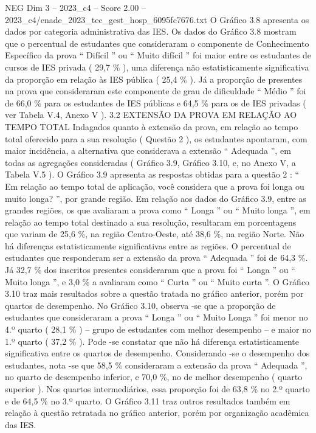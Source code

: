 \begin{textsample}{NEG Dim 3 – 2023\_c4 – Score 2.00 – 2023\_c4/enade\_2023\_tec\_gest\_hosp\_6095fc7676.txt}
O Gráfico 3.8 apresenta os dados por categoria administrativa das IES.
Os dados do Gráfico 3.8 mostram que o percentual de estudantes que consideraram o componente de Conhecimento Específico da prova “ Difícil ” ou “ Muito difícil ” foi maior entre os estudantes de cursos de IES privada ( 29,7 \% ), uma diferença não estatisticamente significativa da proporção em relação às IES pública ( 25,4 \% ).
Já a proporção de presentes na prova que consideraram este componente de grau de dificuldade “ Médio ” foi de 66,0 \% para os estudantes de IES públicas e 64,5 \% para os de IES privadas ( ver Tabela V.4, Anexo V ). 3.2 EXTENSÃO DA PROVA EM RELAÇÃO AO TEMPO TOTAL Indagados quanto à extensão da prova, em relação ao tempo total oferecido para a sua resolução ( Questão 2 ), os estudantes apontaram, com maior incidência, a alternativa que considerava a extensão “ Adequada ”, em todas as agregações consideradas ( Gráfico 3.9, Gráfico 3.10, e, no Anexo V, a Tabela V.5 ).
O Gráfico 3.9 apresenta as respostas obtidas para a questão 2 : “ Em relação ao tempo total de aplicação, você considera que a prova foi longa ou muito longa? ”, por grande região.
Em relação aos dados do Gráfico 3.9, entre as grandes regiões, os que avaliaram a prova como “ Longa ” ou “ Muito longa ”, em relação ao tempo total destinado a sua resolução, resultaram em porcentagens que variam de 25,6 \%, na região Centro-Oeste, até 38,6 \%, na região Norte.
Não há diferenças estatisticamente significativas entre as regiões.
O percentual de estudantes que responderam ser a extensão da prova “ Adequada ” foi de 64,3 \%.
Já 32,7 \% dos inscritos presentes consideraram que a prova foi “ Longa ” ou “ Muito longa ”, e 3,0 \% a avaliaram como “ Curta ” ou “ Muito curta ”.
O Gráfico 3.10 traz mais resultados sobre a questão tratada no gráfico anterior, porém por quartos de desempenho.
No Gráfico 3.10, observa -se que a proporção de estudantes que consideraram a prova “ Longa ” ou “ Muito Longa ” foi menor no 4.º quarto ( 28,1 \% ) – grupo de estudantes com melhor desempenho – e maior no 1.º quarto ( 37,2 \% ).
Pode -se constatar que não há diferença estatisticamente significativa entre os quartos de desempenho.
Considerando -se o desempenho dos estudantes, nota -se que 58,5 \% consideraram a extensão da prova “ Adequada ”, no quarto de desempenho inferior, e 70,0 \%, no de melhor desempenho ( quarto superior ).
Nos quartos intermediários, essa proporção foi de 63,8 \% no 2.º quarto e de 64,5 \% no 3.º quarto.
O Gráfico 3.11 traz outros resultados também em relação à questão retratada no gráfico anterior, porém por organização acadêmica das IES.

\end{textsample}
